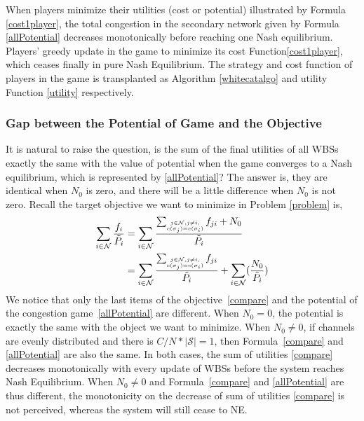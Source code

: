 When players minimize their utilities (cost or potential) illustrated by Formula \ref{cost1player}, the total congestion in the secondary network given by Formula \ref{allPotential} decreases monotonically before reaching one Nash equilibrium. Players' greedy update in the game to minimize its cost Function\ref{cost1player}, which ceases finally in pure Nash Equilibrium. The strategy and cost function of players in the game is transplanted as Algorithm \ref{whitecatalgo} and utility Function \ref{utility} respectively.


\subsubsection*{Gap between the Potential of Game and the Objective}
It is natural to raise the question, is the sum of the final utilities of all WBSs exactly the same with the value of potential when the game converges to a Nash equilibrium, which is represented by \ref{allPotential}?
The answer is, they are identical when $N_0$ is zero, and there will be a little difference when $N_0$ is not zero.
Recall the target objective we want to minimize in Problem \ref{problem} is,
\begin{equation}
\label{compare}
\begin{split}	
\sum_{i\in \mathcal{N}}\dfrac{f_i}{\tilde{P_i}}
& = \sum\limits_{i\in \mathcal{N}}\dfrac{\sum_{\tiny\substack{j\in \mathcal{N}, j\ne i,\\ c(\sigma_j)=c(\sigma_i)}}f_{ji}+N_0}{\tilde{P_i}}\\
& = \sum\limits_{i\in \mathcal{N}}\dfrac{\sum_{\tiny\substack{j\in \mathcal{N}, j\ne i,\\ c(\sigma_j)=c(\sigma_i)}}f_{ji}}{\tilde{P_i}} + \sum\limits_{i\in \mathcal{N}}  (\dfrac{N_0}{\tilde{P_i}})\\
\end{split}
\end{equation}
We notice that only the last items of the objective~\ref{compare} and the potential of the congestion game~\ref{allPotential} are different.
When $N_0=0$, the potential is exactly the same with the object we want to minimize.
When $N_0\neq 0$, if channels are evenly distributed and there is $C/N*\mid \mathcal{S}\mid = 1$, then Formula~\ref{compare} and \ref{allPotential} are also the same.
In both cases, the sum of utilities \ref{compare} decreases monotonically with every update of WBSs before the system reaches Nash Equilibrium.
%
When $N_0\neq 0$ and Formula~\ref{compare} and \ref{allPotential} are thus different, the monotonicity on the decrease of sum of utilities \ref{compare} is not perceived, whereas the system will still cease to NE.


